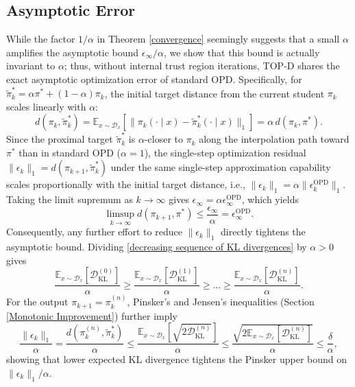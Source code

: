 \documentclass{article}
\theoremstyle{plain}
\theoremstyle{definition}
\theoremstyle{remark}
\begin{document}
\subsection{Asymptotic Error}\label{Asymptotic Error}
While the factor $1/\alpha$ in Theorem \ref{convergence} seemingly suggests that a small $\alpha$ amplifies the asymptotic bound $\epsilon_\infty/\alpha$, we show that this bound is actually invariant to $\alpha$; thus, without internal trust region iterations, TOP-D shares the exact asymptotic optimization error of standard OPD. Specifically, for $\tilde{\pi}_k^* = \alpha\pi^* + (1-\alpha)\pi_k$, the initial target distance from the current student $\pi_k$ scales linearly with $\alpha$:
\begin{equation}
	d(\pi_k, \tilde{\pi}_k^*) = \mathbb{E}_{x\sim\mathcal{D}_x}\left[\lVert\pi_k(\cdot\mid x) - \tilde{\pi}_k^*(\cdot\mid x)\rVert_1\right] = \alpha \, d(\pi_k, \pi^*).
\end{equation}
Since the proximal target $\tilde{\pi}_k^*$ is $\alpha$-closer to $\pi_k$ along the interpolation path toward $\pi^*$ than in standard OPD ($\alpha=1$), the single-step optimization residual $\lVert\epsilon_k\rVert_1 = d(\pi_{k+1}, \tilde{\pi}_k^*)$ under the same single-step approximation capability scales proportionally with the initial target distance, i.e., $\lVert\epsilon_k\rVert_1 = \alpha \lVert\epsilon_k^{\mathrm{OPD}}\rVert_1$. Taking the limit supremum as $k\to\infty$ gives $\epsilon_\infty = \alpha \epsilon_\infty^{\mathrm{OPD}}$, which yields
\begin{equation}
	\limsup_{k\to\infty} d(\pi_{k+1}, \pi^*) \le \frac{\epsilon_\infty}{\alpha} = \epsilon_\infty^{\mathrm{OPD}}.
\end{equation}
Consequently, any further effort to reduce $\lVert\epsilon_k\rVert_1$ directly tightens the asymptotic bound. Dividing \eqref{decreasing sequence of KL divergences} by $\alpha > 0$ gives
\begin{equation}
	\frac{\mathbb{E}_{x\sim\mathcal{D}_x}\left[\mathcal{D}_{\mathrm{KL}}^{(0)}\right]}{\alpha} \ge \frac{\mathbb{E}_{x\sim\mathcal{D}_x}\left[\mathcal{D}_{\mathrm{KL}}^{(1)}\right]}{\alpha} \ge \dots \ge \frac{\mathbb{E}_{x\sim\mathcal{D}_x}\left[\mathcal{D}_{\mathrm{KL}}^{(n)}\right]}{\alpha}.
\end{equation}
For the output $\pi_{k+1} = \pi_k^{(n)}$, Pinsker's and Jensen's inequalities (Section \ref{Monotonic Improvement}) further imply
\begin{equation}
	\frac{\lVert\epsilon_k\rVert_1}{\alpha} = \frac{d(\pi_k^{(n)}, \tilde{\pi}_k^*)}{\alpha} \le \frac{\mathbb{E}_{x\sim\mathcal{D}_x}\left[\sqrt{2\mathcal{D}_{\mathrm{KL}}^{(n)}}\right]}{\alpha} \le \frac{\sqrt{2\mathbb{E}_{x\sim\mathcal{D}_x}\left[\mathcal{D}_{\mathrm{KL}}^{(n)}\right]}}{\alpha} \le \frac{\delta}{\alpha},
\end{equation}
showing that lower expected KL divergence tightens the Pinsker upper bound on $\lVert\epsilon_k\rVert_1/\alpha$.
\end{document}
